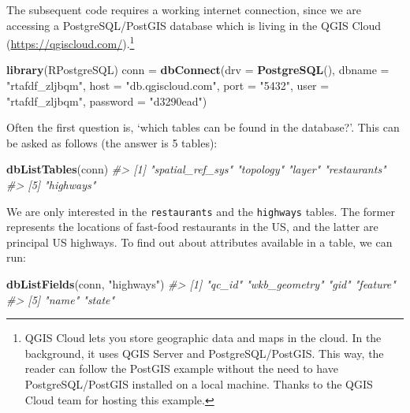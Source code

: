 \documentclass[]{krantz}
\newenvironment{Shaded}{\begin{snugshade}}{\end{snugshade}}
\newcommand{\CommentTok}[1]{\textcolor[rgb]{0.37,0.37,0.37}{\textit{#1}}}
\newcommand{\DataTypeTok}[1]{\textcolor[rgb]{0.27,0.27,0.27}{#1}}
\newcommand{\KeywordTok}[1]{\textcolor[rgb]{0.27,0.27,0.27}{\textbf{#1}}}
\newcommand{\NormalTok}[1]{#1}
\newcommand{\StringTok}[1]{\textcolor[rgb]{0.5,0.5,0.5}{#1}}
\let\rmarkdownfootnote\footnote%
\def\footnote{\protect\rmarkdownfootnote}
\begin{document}
The subsequent code requires a working internet connection, since we are accessing a PostgreSQL/PostGIS database which is living in the QGIS Cloud (\url{https://qgiscloud.com/}).\footnote{QGIS Cloud lets you store geographic data and maps in the cloud.
  In the background, it uses QGIS Server and PostgreSQL/PostGIS.
  This way, the reader can follow the PostGIS example without the need to have PostgreSQL/PostGIS installed on a local machine.
  Thanks to the QGIS Cloud team for hosting this example.}

\begin{Shaded}
\begin{Highlighting}[]
\KeywordTok{library}\NormalTok{(RPostgreSQL)}
\NormalTok{conn =}\StringTok{ }\KeywordTok{dbConnect}\NormalTok{(}\DataTypeTok{drv =} \KeywordTok{PostgreSQL}\NormalTok{(), }\DataTypeTok{dbname =} \StringTok{"rtafdf_zljbqm"}\NormalTok{,}
                 \DataTypeTok{host =} \StringTok{"db.qgiscloud.com"}\NormalTok{,}
                 \DataTypeTok{port =} \StringTok{"5432"}\NormalTok{, }\DataTypeTok{user =} \StringTok{"rtafdf_zljbqm"}\NormalTok{, }
                 \DataTypeTok{password =} \StringTok{"d3290ead"}\NormalTok{)}
\end{Highlighting}
\end{Shaded}

Often the first question is, `which tables can be found in the database?'.
This can be asked as follows (the answer is 5 tables):

\begin{Shaded}
\begin{Highlighting}[]
\KeywordTok{dbListTables}\NormalTok{(conn)}
\CommentTok{#> [1] "spatial_ref_sys" "topology"        "layer"           "restaurants"    }
\CommentTok{#> [5] "highways" }
\end{Highlighting}
\end{Shaded}

We are only interested in the \texttt{restaurants} and the \texttt{highways} tables.
The former represents the locations of fast-food restaurants in the US, and the latter are principal US highways.
To find out about attributes available in a table, we can run:

\begin{Shaded}
\begin{Highlighting}[]
\KeywordTok{dbListFields}\NormalTok{(conn, }\StringTok{"highways"}\NormalTok{)}
\CommentTok{#> [1] "qc_id"        "wkb_geometry" "gid"          "feature"     }
\CommentTok{#> [5] "name"         "state"   }
\end{Highlighting}
\end{Shaded}
\end{document}
